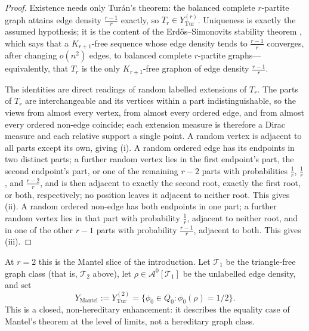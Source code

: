 \documentclass[11pt]{article}
\theoremstyle{definition}
\newcommand{\A}{\mathcal{A}}
\newcommand{\T}{\mathcal{T}}
\begin{document}
\begin{proof}
Existence needs only Tur\'an's theorem: the balanced complete $r$-partite graph attains
edge density $\frac{r-1}r$ exactly, so $T_r\in Y_{\mathrm{Tur}}^{(r)}$.  Uniqueness is
exactly the assumed hypothesis; it is the content of the Erd\H{o}s--Simonovits stability
theorem \cite{ErdosSimonovits,Simonovits1968}, which says that a $K_{r+1}$-free sequence
whose edge density tends to $\frac{r-1}{r}$ converges, after changing $o(n^2)$ edges, to
balanced complete $r$-partite graphs---equivalently, that $T_r$ is the only $K_{r+1}$-free
graphon of edge density $\frac{r-1}r$.

The identities are direct readings of random labelled extensions of $T_r$.  The parts of
$T_r$ are interchangeable and its vertices within a part indistinguishable, so the views
from almost every vertex, from almost every ordered edge, and from almost every ordered
non-edge coincide; each extension measure is therefore a Dirac measure and each relative
support a single point.  A random vertex is adjacent to all parts except its own, giving
(i).  A random ordered edge has its endpoints in two distinct parts; a further random
vertex lies in the first endpoint's part, the second endpoint's part, or one of the
remaining $r-2$ parts with probabilities $\frac1r$, $\frac1r$, and $\frac{r-2}r$, and is
then adjacent to exactly the second root, exactly the first root, or both, respectively;
no position leaves it adjacent to neither root.  This gives (ii).  A random ordered
non-edge has both endpoints in one part; a further random vertex lies in that part with
probability $\frac1r$, adjacent to neither root, and in one of the other $r-1$ parts
with probability $\frac{r-1}r$, adjacent to both.  This gives (iii).
\end{proof}

At $r=2$ this is the Mantel slice of the introduction.  Let $\T_1$ be the triangle-free
graph class (that is, $\T_2$ above), let $\rho\in\A^0[\T_1]$ be the unlabelled edge
density, and set
\[
  Y_{\mathrm{Mantel}}
  :=
  Y_{\mathrm{Tur}}^{(2)}
  =
  \{\phi_0\in Q_0:\phi_0(\rho)=1/2\}.
\]
This is a closed, non-hereditary enhancement: it describes the equality case of Mantel's
theorem at the level of limits, not a hereditary graph class.
\end{document}
